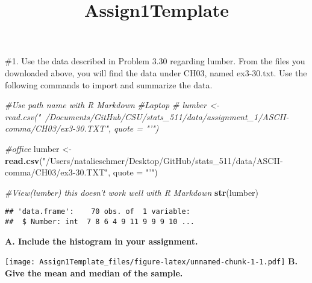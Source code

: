 \documentclass[]{article}
\title{Assign1Template}
\author{}
\date{}
\newenvironment{Shaded}{\begin{snugshade}}{\end{snugshade}}
\newcommand{\CommentTok}[1]{\textcolor[rgb]{0.56,0.35,0.01}{\textit{#1}}}
\newcommand{\DataTypeTok}[1]{\textcolor[rgb]{0.13,0.29,0.53}{#1}}
\newcommand{\KeywordTok}[1]{\textcolor[rgb]{0.13,0.29,0.53}{\textbf{#1}}}
\newcommand{\NormalTok}[1]{#1}
\newcommand{\OperatorTok}[1]{\textcolor[rgb]{0.81,0.36,0.00}{\textbf{#1}}}
\newcommand{\StringTok}[1]{\textcolor[rgb]{0.31,0.60,0.02}{#1}}
\begin{document}
\maketitle

\#1. Use the data described in Problem 3.30 regarding lumber. From the
files you downloaded above, you will find the data under CH03, named
ex3-30.txt. Use the following commands to import and summarize the data.

\begin{Shaded}
\begin{Highlighting}[]
\CommentTok{#Use path name with R Markdown}
\CommentTok{#Laptop}
\CommentTok{# lumber <- read.csv("~/Documents/GitHub/CSU/stats_511/data/assignment_1/ASCII-comma/CH03/ex3-30.TXT", quote = "'")}

\CommentTok{#office}
\NormalTok{lumber <-}\StringTok{ }\KeywordTok{read.csv}\NormalTok{(}\StringTok{"/Users/natalieschmer/Desktop/GitHub/stats_511/data/ASCII-comma/CH03/ex3-30.TXT"}\NormalTok{, }\DataTypeTok{quote =} \StringTok{"'"}\NormalTok{)}

\CommentTok{#View(lumber)  this doesn't work well with R Markdown}
\KeywordTok{str}\NormalTok{(lumber)}
\end{Highlighting}
\end{Shaded}

\begin{verbatim}
## 'data.frame':    70 obs. of  1 variable:
##  $ Number: int  7 8 6 4 9 11 9 9 9 10 ...
\end{verbatim}

\textbf{A. Include the histogram in your assignment.}

\begin{Shaded}
\end{Shaded}

\texttt{[image: Assign1Template\_files/figure-latex/unnamed-chunk-1-1.pdf]}
\textbf{B. Give the mean and median of the sample.}

\begin{Shaded}
\end{Shaded}
\end{document}
